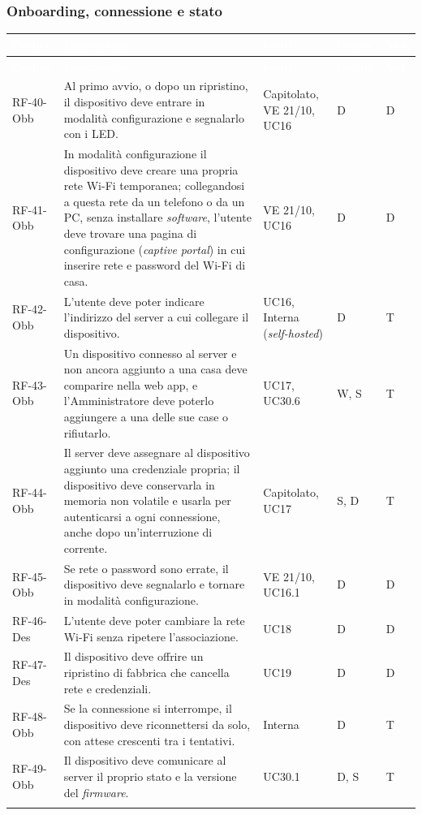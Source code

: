 \documentclass[12pt,a4paper]{article}
\newcommand{\thc}[1]{\textcolor{white}{\textbf{#1}}}
\newcommand{\rl}{\\ \arrayrulecolor{bfline}\hline}
\begin{document}
\subsubsection{Onboarding, connessione e stato}

\begin{longtable}{>{\raggedright\arraybackslash}p{}>{\raggedright\arraybackslash}p{}>{\raggedright\arraybackslash}p{}>{\raggedright\arraybackslash}p{}>{\centering\arraybackslash}p{}}
\rowcolor{bfblue}\thc{Codice} & \thc{Descrizione} & \thc{Fonti} & \thc{Comp.} & \thc{Ver.} \\
\endfirsthead
\rowcolor{bfblue}\thc{Codice} & \thc{Descrizione} & \thc{Fonti} & \thc{Comp.} & \thc{Ver.} \\
\endhead
RF-40-Obb & Al primo avvio, o dopo un ripristino, il dispositivo deve entrare in modalità configurazione e segnalarlo con i LED. & Capitolato, VE 21/10, UC16 & D & D \rl
RF-41-Obb & In modalità configurazione il dispositivo deve creare una propria rete Wi-Fi temporanea; collegandosi a questa rete da un telefono o da un PC, senza installare \emph{software}, l'utente deve trovare una pagina di configurazione (\emph{captive portal}) in cui inserire rete e password del Wi-Fi di casa. & VE 21/10, UC16 & D & D \rl
RF-42-Obb & L'utente deve poter indicare l'indirizzo del server a cui collegare il dispositivo. & UC16, Interna (\emph{self-hosted}) & D & T \rl
RF-43-Obb & Un dispositivo connesso al server e non ancora aggiunto a una casa deve comparire nella web app, e l'Amministratore deve poterlo aggiungere a una delle sue case o rifiutarlo. & UC17, UC30.6 & W, S & T \rl
RF-44-Obb & Il server deve assegnare al dispositivo aggiunto una credenziale propria; il dispositivo deve conservarla in memoria non volatile e usarla per autenticarsi a ogni connessione, anche dopo un'interruzione di corrente. & Capitolato, UC17 & S, D & T \rl
RF-45-Obb & Se rete o password sono errate, il dispositivo deve segnalarlo e tornare in modalità configurazione. & VE 21/10, UC16.1 & D & D \rl
RF-46-Des & L'utente deve poter cambiare la rete Wi-Fi senza ripetere l'associazione. & UC18 & D & D \rl
RF-47-Des & Il dispositivo deve offrire un ripristino di fabbrica che cancella rete e credenziali. & UC19 & D & D \rl
RF-48-Obb & Se la connessione si interrompe, il dispositivo deve riconnettersi da solo, con attese crescenti tra i tentativi. & Interna & D & T \rl
RF-49-Obb & Il dispositivo deve comunicare al server il proprio stato e la versione del \emph{firmware}. & UC30.1 & D, S & T \rl
\end{longtable}
\end{document}
